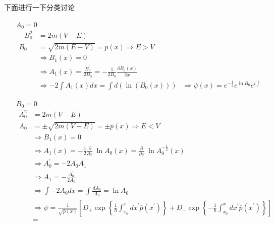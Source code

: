\documentclass{article}
\newcommand{\Da}[2]{\frac{\partial}{\partial#2}#1}
\begin{document}
下面进行一下分类讨论
\begin{enumerate}
    \item[$A_0=0$] 
    \begin{align*}
        -B_0^2&=2m(V-E)\\
        B_0&=\sqrt{2m(E-V)}=p(x)\Rightarrow E>V\\
        &\Rightarrow B_1(x)=0\\
        &\Rightarrow A_1(x)=\frac{B^\prime_0}{2B_0}=-\frac{1}{2B_0}\frac{\partial B_0(x)}{\partial x}\\
        &\Rightarrow -2\int A_1(x)dx=\int d(\ln(B_0(x)))
        &\Rightarrow \psi(x)=e^{-\frac{1}{2}}e^{\ln B_0}e^{i\int}
    \end{align*}
    \item[$B_0=0$]
    \begin{align*}
        A_0^2&=2m(V-E)\\
        A_0&=\pm\sqrt{2m(V-E)}=\pm\bar{p}(x)\Rightarrow E<V\\
        &\Rightarrow B_1(x)=0\\
        &\Rightarrow A_1(x)=-\frac{1}{2}\Da{~}{x}\ln A_0(x)=\Da{~}{x}\ln A_0^{-\frac{1}{2}}(x)\\
        &\Rightarrow A_0^\prime =-2A_0A_1\\
        &\Rightarrow A_1=-\frac{A_0^\prime}{2A_0}\\
        &\Rightarrow \int-2A_0 dx=\int \frac{dA_0}{A_0}=\ln A_0\\
        &\Rightarrow \psi=\frac{1}{\sqrt{\bar{p}(x)}}\left[D_+\exp\left\{\frac{1}{\hbar}\int_{x_0}^{x}dx^\prime\bar{p}(x^\prime)\right\}+D_-\exp\left\{-\frac{1}{\hbar}\int_{x_0}^{x}dx^\prime\bar{p}(x^\prime)\right\}\right]\\
        &=
    \end{align*}
\end{enumerate}
\end{document}
